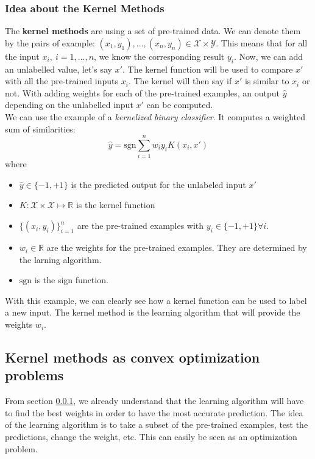 \documentclass[a4paper, 11pt]{article}
\begin{document}
\subsubsection{Idea about the Kernel Methods}
\label{meth}
The {\bf kernel methods} are using a set of pre-trained data. We can denote them by the pairs of example: $(x_1, y_1), \ldots, (x_n,y_n) \in \mathcal{X} \times \mathcal{Y}$. This means that for all the input $x_i, ~ i=1,\ldots,n$, we know the corresponding result $y_i$. Now, we can add an unlabelled value, let's say $x'$. The kernel function will be used to compare $x'$ with all the pre-trained inputs $x_i$. The kernel will then say if $x'$ is similar to $x_i$ or not. With adding weights for each of the pre-trained examples, an output $\hat{y}$ depending on the unlabelled input $x'$ can be computed. 
\\ 
We can use the example of a {\it kernelized binary classifier}. It computes a weighted sum of similarities:
\begin{equation}
\hat{y} = \text{sgn}\sum_{i=1}^{n }w_i y_i K(x_i,x')
\end{equation}
where
\begin{itemize}
\item $\hat{y}\in\{-1,+1\}$ is the predicted output for the unlabeled input $x'$
\item $K: \mathcal{X}\times\mathcal{X} \mapsto \mathbb{R}$ is the kernel function
\item $\{(x_i, y_i)\}_{i=1}^{n}$ are the pre-trained examples with $y_i\in\{-1,+1\}\forall i$.
\item $w_i\in \mathbb{R}$ are the weights for the pre-trained examples. They are determined by the larning algorithm.
\item $\text{sgn}$ is the sign function.
\end{itemize}
With this example, we can clearly see how a kernel function can be used to label a new input. The kernel method is the learning algorithm that will provide the weights $w_i$.

\subsection{Kernel methods as convex optimization problems}

From section \ref{meth}, we already understand that the learning algorithm will have to find the best weights in order to have the most accurate prediction. The idea of the learning algorithm is to take a subset of the pre-trained examples, test the predictions, change the weight, etc. This can easily be seen as an optimization problem.  
\\\\
\end{document}
